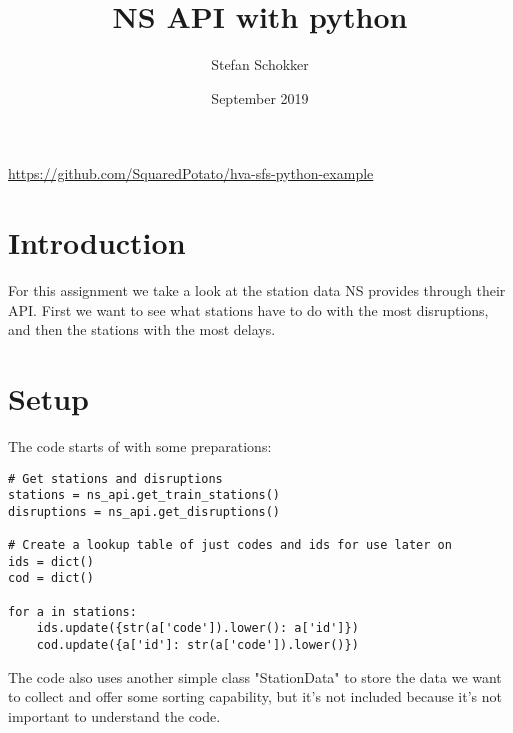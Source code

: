 \documentclass[a4paper, 12pt, one column]{article}
\title{NS API with python}
\author{Stefan Schokker}
\date{September 2019}
\begin{document}
\maketitle

\begin{center}
    \url{https://github.com/SquaredPotato/hva-sfs-python-example}
\end{center}

\section{Introduction}
For this assignment we take a look at the station data NS provides through their API. First we want to see what stations have to do with the most disruptions, and then the stations with the most delays. 

\section{Setup}
The code starts of with some preparations:
\begin{lstlisting}
# Get stations and disruptions
stations = ns_api.get_train_stations()
disruptions = ns_api.get_disruptions()

# Create a lookup table of just codes and ids for use later on
ids = dict()
cod = dict()

for a in stations:
    ids.update({str(a['code']).lower(): a['id']})
    cod.update({a['id']: str(a['code']).lower()})
\end{lstlisting}
The code also uses another simple class "StationData" to store the data we want to collect and offer some sorting capability, but it's not included because it's not important to understand the code.
\newpage
\end{document}
